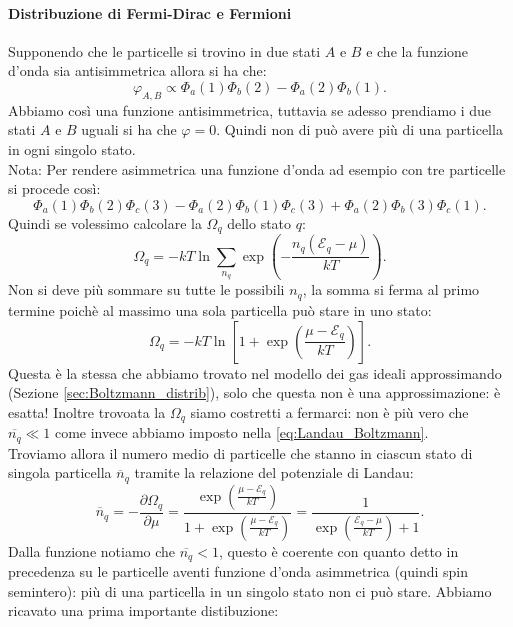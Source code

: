 \paragraph{Distribuzione di Fermi-Dirac e Fermioni}%
Supponendo che le particelle si trovino in due stati $A$ e $B$ e che la funzione d'onda sia antisimmetrica allora si ha che:
\[
	\varphi_{A,B} \propto \Phi _{a}( 1) \Phi _{b}( 2) - \Phi _{a}( 2) \Phi _{b}( 1) 
.\] 
Abbiamo così una funzione antisimmetrica, tuttavia se adesso prendiamo i due stati $A$ e $B$ uguali si ha che $\varphi = 0$. Quindi non di può avere più di una particella in ogni singolo stato. \\
Nota: Per rendere asimmetrica una funzione d'onda ad esempio con tre particelle si procede così:
 \[
	 \Phi _{a}( 1) \Phi _{b }( 2) \Phi _{c}( 3)  - \Phi _{a}( 2) \Phi _{b }( 1) \Phi _{c}( 3) +   \Phi _{a}( 2) \Phi _{b }( 3) \Phi _{c}( 1)
.\] 
Quindi se volessimo calcolare la $\Omega _{q}$ dello stato $q$:
\[
	\Omega _{q}= -kT \ln \sum_{n_{q}}^{} \exp\left( - \frac{n_{q}\left( \mathcal{E} _{q}- \mu  \right) }{kT} \right) \label{eq:Landau-Generic}
.\] 
Non si deve più sommare su tutte le possibili $n_{q}$, la somma si ferma al primo termine poichè al massimo una sola particella può stare in uno stato:
\[
	\Omega _{q} = - k T \ln \left[ 1 + \exp\left( \frac{\mu - \mathcal{E} _{q}}{kT} \right)  \right] 
.\] 
Questa è la stessa che abbiamo trovato nel modello dei gas ideali approssimando (Sezione \ref{sec:Boltzmann_distrib}), solo che questa non è una approssimazione: è esatta! Inoltre trovoata la $\Omega _{q}$ siamo costretti a fermarci: non è più vero che $\overline{n_{q}}\ll 1$ come invece abbiamo imposto nella \ref{eq:Landau_Boltzmann}. \\
Troviamo allora il numero medio di particelle che stanno in ciascun stato di singola particella $\overline{n}_{q}$ tramite la relazione del potenziale di Landau:
\[
	\overline{n}_{q} = - \frac{\partial \Omega _{q}}{\partial \mu } =
	\frac{\exp\left( \frac{\mu - \mathcal{E} _{q}}{kT} \right)  }{1 + \exp\left( \frac{\mu - \mathcal{E} _{q}}{kT} \right) } = \frac{1}{\exp\left( \frac{\mathcal{E}_{q}-\mu }{kT} \right) +1}
.\] 
Dalla funzione notiamo che $\overline{n_{q}}<1$, questo è coerente con quanto detto in precedenza su le particelle aventi funzione d'onda asimmetrica (quindi spin semintero): più di una particella in un singolo stato non ci può stare.
Abbiamo ricavato una prima importante distibuzione:

